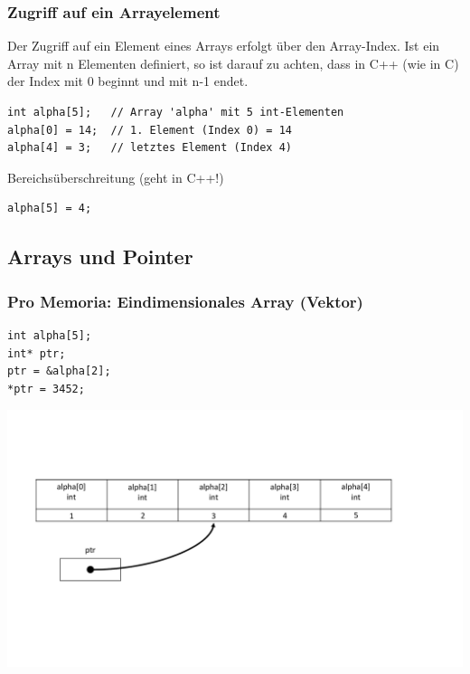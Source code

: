 \subsubsection{Zugriff auf ein Arrayelement}
\begin{hinweis}
Der Zugriff auf ein Element eines Arrays erfolgt über den Array-Index. Ist ein Array mit n Elementen definiert, so ist darauf zu achten, dass in C++ (wie in C) der Index mit 0 beginnt und mit n-1 endet.
\end{hinweis}
\noindent
\begin{minipage}{\linewidth}
\begin{lstlisting}
int alpha[5];	// Array 'alpha' mit 5 int-Elementen 
alpha[0] = 14;	// 1. Element (Index 0) = 14
alpha[4] = 3;	// letztes Element (Index 4)
\end{lstlisting}
\begin{achtung}
Bereichsüberschreitung (geht in C++!)
\end{achtung}
\begin{lstlisting}
alpha[5] = 4;
\end{lstlisting}
\end{minipage}

\subsection{Arrays und Pointer}

\subsubsection{Pro Memoria: Eindimensionales Array (Vektor)}
\noindent
\begin{minipage}{0.2\linewidth}
\begin{lstlisting}
int alpha[5];
int* ptr;
ptr = &alpha[2];
*ptr = 3452;
\end{lstlisting}
\end{minipage}
\hspace{0.01\linewidth}
\begin{minipage}{0.75\linewidth}
	\includegraphics[width=\linewidth]{images/pointer9.pdf}
\end{minipage}

